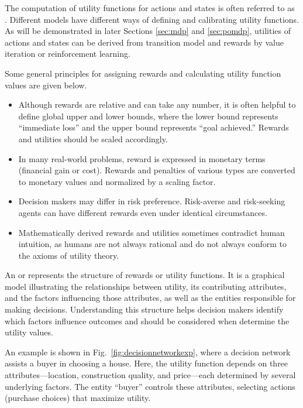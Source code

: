 The computation of utility functions for actions and states is often referred to as . Different models have different ways of defining and calibrating utility functions. As will be demonstrated in later Sections \ref{sec:mdp} and \ref{sec:pomdp}, utilities of actions and states can be derived from transition model and rewards by value iteration or reinforcement learning. 

Some general principles for assigning rewards and calculating utility function values are given below.
\begin{itemize}
	\item Although rewards are relative and can take any number, it is often helpful to define global upper and lower bounds, where the lower bound represents ``immediate loss'' and the upper bound represents ``goal achieved.'' Rewards and utilities should be scaled accordingly.
	\item In many real-world problems, reward is expressed in monetary terms (financial gain or cost). Rewards and penalties of various types are converted to monetary values and normalized by a scaling factor.
	\item Decision makers may differ in risk preference. Risk-averse and risk-seeking agents can have different rewards even under identical circumstances.
	\item Mathematically derived rewards and utilities sometimes contradict human intuition, as humans are not always rational and do not always conform to the axioms of utility theory.
\end{itemize}

An  or  represents the structure of rewards or utility functions. It is a graphical model illustrating the relationships between utility, its contributing attributes, and the factors influencing those attributes, as well as the entities responsible for making decisions. Understanding this structure helps decision makers identify which factors influence outcomes and should be considered when determine the utility values.

An example is shown in Fig.~\ref{fig:decisionnetworkexp}, where a decision network assists a buyer in choosing a house. Here, the utility function depends on three attributes—location, construction quality, and price—each determined by several underlying factors. The entity ``buyer'' controls these attributes, selecting actions (purchase choices) that maximize utility.

